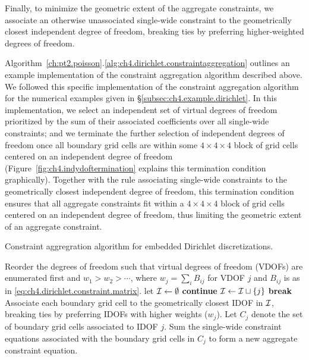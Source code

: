 Finally, to minimize the geometric extent of the aggregate constraints, we associate an otherwise unassociated single-wide constraint to the geometrically closest independent degree of freedom, breaking ties by preferring higher-weighted degrees of freedom.

Algorithm~\ref{ch:pt2.poisson}.\ref{alg:ch4.dirichlet.constraintaggregation} outlines an example implementation of the constraint aggregation algorithm described above. We followed this specific implementation of the constraint aggregation algorithm for the numerical examples given in \S\ref{subsec:ch4.example.dirichlet}. In this implementation, we select an independent set of virtual degrees of freedom prioritized by the sum of their associated coefficients over all single-wide constraints; and we terminate the further selection of independent degrees of freedom once all boundary grid cells are within some $4 \times 4 \times 4$ block of grid cells centered on an independent degree of freedom (Figure~\ref{fig:ch4.indydoftermination} explains this termination condition graphically). Together with the rule associating single-wide constraints to the geometrically closest independent degree of freedom, this termination condition ensures that all aggregate constraints fit within a $4 \times 4 \times 4$ block of grid cells centered on an independent degree of freedom, thus limiting the geometric extent of an aggregate constraint.

\begin{algorithm}[htbp]
\caption{Constraint aggregration algorithm for embedded Dirichlet discretizations.}
\label{alg:ch4.dirichlet.constraintaggregation}
\begin{algorithmic}[1]
\STATE Reorder the degrees of freedom such that virtual degrees of freedom (VDOFs) are enumerated first and $w_1 > w_2 > \dotsm$, where $w_j = \sum_i B_{ij}$ for VDOF $j$ and $B_{ij}$ is as in \eqref{eq:ch4.dirichlet.constraint.matrix}.
\STATE let $\mathcal{I} \leftarrow \emptyset$ 
\STATE {}
    \STATE {}
        \STATE \textbf{continue}
    \ENDIF
    \STATE $\mathcal{I} \leftarrow \mathcal{I} \sqcup \left\lbrace j \right\rbrace$ 
    \STATE {}
        \STATE \textbf{break}
    \ENDIF
\ENDFOR
\STATE Associate each boundary grid cell to the geometrically closest IDOF in $\mathcal{I}$, breaking ties by preferring IDOFs with higher weights ($w_j$). Let $C_j$ denote the set of boundary grid cells associated to IDOF $j$.
    \STATE Sum the single-wide constraint equations associated with the boundary grid cells in $C_j$ to form a new aggregate constraint equation.
\ENDFOR
\end{algorithmic}
\end{algorithm}

